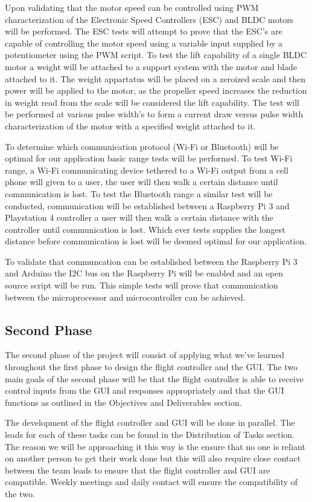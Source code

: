 Upon validating that the motor speed can be controlled using PWM characterization of the Electronic Speed Controllers (ESC) and BLDC motors will be performed. The ESC tests will attempt to prove that the ESC's are capable of controlling the motor speed using a variable input supplied by a potentiometer using the PWM script. To test the lift capability of a single BLDC motor a weight will be attached to a support system with the motor and blade attached to it. The weight appartatus will be placed on a zeroized scale and then power will be applied to the motor, as the propeller speed increases the reduction in weight read from the scale will be considered the lift capability. The test will be performed at various pulse width's to form a current draw versus pulse width characterization of the motor with a specified weight attached to it. 

To determine which communication protocol (Wi-Fi or Bluetooth) will be optimal for our application basic range tests will be performed. To test Wi-Fi range, a Wi-Fi communicating device tethered to a Wi-Fi output from a cell phone will given to a user, the user will then walk a certain distance until communication is lost. To test the Bluetooth range a similar test will be conducted, communication will be established between a Raspberry Pi 3 and Playstation 4 controller a user will then walk a certain distance with the controller until communication is lost. Which ever tests supplies the longest distance before communication is lost will be deemed optimal for our application.

To validate that communcation can be established between the Raspberry Pi 3 and Arduino the I2C bus on the Raspberry Pi will be enabled and an open source script will be run. This simple tests will prove that communication between the microprocessor and microcontroller can be achieved.

\subsection{Second Phase}
The second phase of the project will consist of applying what we've learned throughout the first phase to design the flight controller and the GUI. The two main goals of the second phase will be that the flight controller is able to receive control inputs from the GUI and responses appropriately and that the GUI functions as outlined in the Objectives and Deliverables section.

The development of the flight controller and GUI will be done in parallel. The leads for each of these tasks can be found in the Distribution of Tasks section. The reason we will be approaching it this way is the ensure that no one is reliant on another person to get their work done but this will also require close contact between the team leads to ensure that the flight controller and GUI are compatible. Weekly meetings and daily contact will ensure the compatibility of the two.

